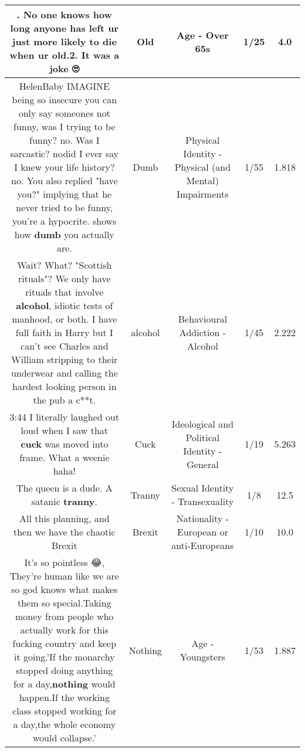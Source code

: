 \documentclass[11pt]{article}
\newlength\mylength
\begin{document}
\begin{center}
\begin{longtable}{|C{.65\mylength}|C{.30\mylength}|C{.12\mylength}|C{.12\mylength}|C{.12\mylength}|}
  \small {}. No one knows how long anyone has left ur just more likely to die when ur \textbf{old}.2. It was a joke 🙄\normalsize   & Old & Age - Over 65s & 1/25 & 4.0 \\  \hline
  \small HelenBaby IMAGINE being so insecure you can only say someones not funny, was I trying to be funny? no. Was I sarcastic? nodid I ever say I knew your life history? no. You also replied "have you?" implying that he never tried to be funny, you're a hypocrite. shows how \textbf{dumb} you actually are.\normalsize   & Dumb & Physical Identity - Physical (and Mental) Impairments & 1/55 & 1.818 \\  \hline
  \small Wait? What? "Scottish rituals"? We only have rituals that involve \textbf{alcohol}, idiotic tests of manhood, or both. I have full faith in Harry but I can't see Charles and William stripping to their underwear and calling the hardest looking person in the pub a c**t.\normalsize   & alcohol & Behavioural Addiction - Alcohol & 1/45 & 2.222 \\  \hline
  \small \@3:44 I literally laughed out loud when I saw that \textbf{cuck} was moved into frame. What a weenie haha!\normalsize   & Cuck &  Ideological and Political Identity - General & 1/19 & 5.263 \\  \hline
  \small The queen is a dude. A satanic \textbf{tranny}.\normalsize   & Tranny & Sexual Identity - Transexuality & 1/8 & 12.5 \\  \hline
  \small All this planning, and then we have the chaotic Brexit\normalsize   & Brexit & Nationality - European or anti-Europeans & 1/10 & 10.0 \\  \hline
  \small It's so pointless 😂, They're human like we are so god knows what makes them so special.Taking money from people who actually work for this fucking country and keep it going.'If the monarchy stopped doing anything for a day,\textbf{nothing} would happen.If the working class stopped working for a day,the whole economy would collapse.'\normalsize   & Nothing & Age - Youngsters & 1/53 & 1.887 \\  \hline

\end{longtable}
\end{center}
\end{document}
